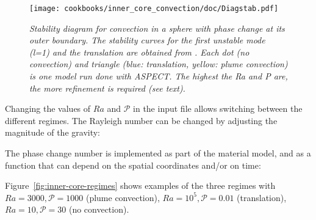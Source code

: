 \documentclass{article}
\begin{document}
\begin{figure}[h]
\begin{center}
\texttt{[image: cookbooks/inner\_core\_convection/doc/Diagstab.pdf]}
	\caption{\it Stability diagram for convection in a sphere with phase change at its outer boundary. The stability curves for the first unstable mode (l=1) and the translation are obtained from \cite{Deguen2013}. Each dot (no convection) and triangle (blue: translation, yellow: plume convection) is one model run done with ASPECT. The highest the Ra and P are, the more refinement is required (see text).}
    \label{fig:diagramme-regime}
\end{center}
\end{figure}


Changing the values of $Ra$ and $\mathcal{P}$ in the input file allows switching between the different regimes.
The Rayleigh number can be changed by adjusting the magnitude of the gravity:

The phase change number is implemented as part of the material model, and as a function that can depend on the
spatial coordinates and/or on time:


Figure~\ref{fig:inner-core-regimes} shows examples of the three regimes with $Ra=3000, \mathcal{P}=1000$ (plume convection),
$Ra=10^5, \mathcal{P}=0.01$ (translation), $Ra=10, \mathcal{P}=30$ (no convection).
\end{document}
